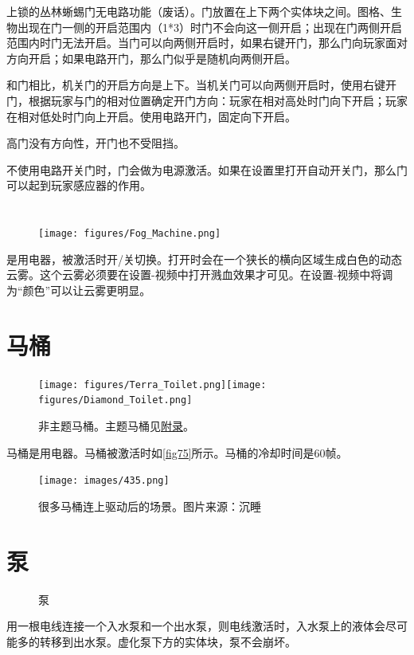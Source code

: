 上锁的丛林蜥蜴门无电路功能（废话）。门放置在上下两个实体块之间。图格、生物出现在门一侧的开启范围内（1*3）时门不会向这一侧开启；出现在门两侧开启范围内时门无法开启。当门可以向两侧开启时，如果右键开门，那么门向玩家面对方向开启；如果电路开门，那么门似乎是随机向两侧开启。

和门相比，机关门的开启方向是上下。当机关门可以向两侧开启时，使用右键开门，根据玩家与门的相对位置确定开门方向：玩家在相对高处时门向下开启；玩家在相对低处时门向上开启。使用电路开门，固定向下开启。

高门没有方向性，开门也不受阻挡。

不使用电路开关门时，门会做为电源激活。如果在设置里打开自动开关门，那么门可以起到玩家感应器的作用。

\section{\FM}
\begin{figure}[!ht]
\centering
\texttt{[image: figures/Fog\_Machine.png]}
\caption{\FM}
\end{figure}
\FM 是用电器，被激活时开/关切换。\FM 打开时会在一个狭长的横向区域生成白色的动态云雾。这个云雾必须要在设置-视频中打开溅血效果才可见。在设置-视频中将调为“颜色”可以让云雾更明显。

\section{马桶}
\begin{figure}[!ht]
\centering
\texttt{[image: figures/Terra\_Toilet.png]}\quad\texttt{[image: figures/Diamond\_Toilet.png]}
\caption{非主题马桶。主题马桶见\hyperref[app44]{附录}。}
\end{figure}
马桶是用电器。马桶被激活时如\autoref{fig75}所示。马桶的冷却时间是60帧。
\begin{figure}[!ht]
\centering
\texttt{[image: images/435.png]}
\caption{很多马桶连上驱动后的场景。图片来源：沉睡}\label{fig75}
\end{figure}

\section{泵}
\begin{figure}[!ht]
\centering
{}\qquad
{}
\caption{泵}
\end{figure}
用一根电线连接一个入水泵和一个出水泵，则电线激活时，入水泵上的液体会尽可能多的转移到出水泵。虚化泵下方的实体块，泵不会崩坏。

